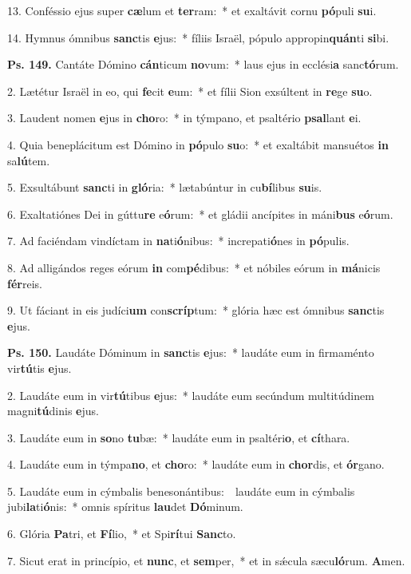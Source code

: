 13. Conféssio ejus super \textbf{cæ}lum et \textbf{ter}ram:~* et exaltávit cornu \textbf{pó}puli \textbf{su}i.

14. Hymnus ómnibus \textbf{sanc}tis \textbf{e}jus:~* fíliis Israël, pópulo appropin\textbf{quán}ti \textbf{si}bi.

\textbf{Ps. 149.} Cantáte Dómino \textbf{cán}ticum \textbf{no}vum:~* laus ejus in ecclési\textbf{a} sanc\textbf{tó}rum.

2. Lætétur Israël in eo, qui \textbf{fe}cit \textbf{e}um:~* et fílii Sion exsúltent in \textbf{re}ge \textbf{su}o.

3. Laudent nomen \textbf{e}jus in \textbf{cho}ro:~* in týmpano, et psaltério \textbf{psal}lant \textbf{e}i.

4. Quia beneplácitum est Dómino in \textbf{pó}pulo \textbf{su}o:~* et exaltábit mansuétos \textbf{in} sa\textbf{lú}tem.

5. Exsultábunt \textbf{sanc}ti in \textbf{gló}ria:~* lætabúntur in cu\textbf{bí}libus \textbf{su}is.

6. Exaltatiónes Dei in gúttu\textbf{re} e\textbf{ó}rum:~* et gládii ancípites in máni\textbf{bus} e\textbf{ó}rum.

7. Ad faciéndam vindíctam in \textbf{na}ti\textbf{ó}nibus:~* increpati\textbf{ó}nes in \textbf{pó}pulis.

8. Ad alligándos reges eórum \textbf{in} com\textbf{pé}dibus:~* et nóbiles eórum in \textbf{má}nicis \textbf{fér}reis.

9. Ut fáciant in eis judíci\textbf{um} con\textbf{scríp}tum:~* glória hæc est ómnibus \textbf{sanc}tis \textbf{e}jus.

\textbf{Ps. 150.} Laudáte Dóminum in \textbf{sanc}tis \textbf{e}jus:~* laudáte eum in firmaménto vir\textbf{tú}tis \textbf{e}jus.

2. Laudáte eum in vir\textbf{tú}tibus \textbf{e}jus:~* laudáte eum secúndum multitúdinem magni\textbf{tú}dinis \textbf{e}jus.

3. Laudáte eum in \textbf{so}no \textbf{tu}bæ:~* laudáte eum in psaltéri\textbf{o}, et \textbf{cí}thara.

4. Laudáte eum in týmpa\textbf{no}, et \textbf{cho}ro:~* laudáte eum in \textbf{chor}dis, et \textbf{ór}gano.

5. Laudáte eum in cýmbalis benesonántibus:~\GreDagger\ laudáte eum in cýmbalis jubi\textbf{la}ti\textbf{ó}nis:~* omnis spíritus \textbf{lau}det \textbf{Dó}minum.

6. Glória \textbf{Pa}tri, et \textbf{Fí}lio,~* et Spi\textbf{rí}tui \textbf{Sanc}to.

7. Sicut erat in princípio, et \textbf{nunc}, et \textbf{sem}per,~* et in s\'{\ae}cula sæcu\textbf{ló}rum. \textbf{A}men.